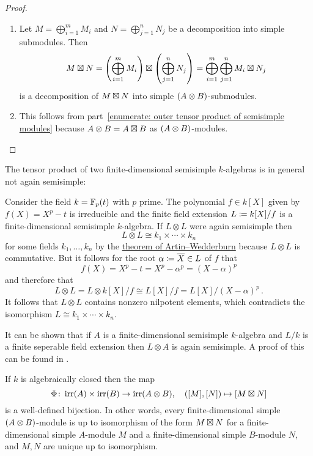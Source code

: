 \begin{proof}
  \leavevmode
  \begin{enumerate}
    \item
      Let $M = \bigoplus_{i=1}^m M_i$ and $N = \bigoplus_{j=1}^n N_j$ be a decomposition into simple submodules.
      Then
      \[
          M \mathbin{\boxtimes} N
        = \left( \bigoplus_{i=1}^m M_i \right) \mathbin{\boxtimes} \left( \bigoplus_{j=1}^n N_j \right)
        = \bigoplus_{i=1}^m \bigoplus_{j=1}^n M_i \mathbin{\boxtimes} N_j
      \]
      is a decomposition of $M \mathbin{\boxtimes} N$ into simple $(A \mathbin{\otimes} B)$-submodules.
    \item
      This follows from part~\ref*{enumerate: outer tensor product of semisimple modules} because $A \mathbin{\otimes} B = A \mathbin{\boxtimes} B$ as $(A \mathbin{\otimes} B)$-modules.
    \qedhere
  \end{enumerate}
\end{proof}


\begin{warning}
  The tensor product of two finite-dimensional semisimple $k$-algebras is in general not again semisimple:
  
  Consider the field $k = \mathbb{F}_p(t)$ with $p$ prime.
  The polynomial $f \in k[X]$ given by $f(X) = X^p - t$ is irreducible and the finite field extension $L \coloneqq k[X]/f$ is a finite-dimensional semisimple $k$-algebra.
  If $L \otimes L$ were again semisimple then
  \[
          L \otimes L
    \cong k_1 \times \dotsb \times k_n
  \]
  for some fields $k_1, \dotsc, k_n$ by the \hyperref[theorem: artin wedderburn theorem]{theorem of Artin--Wedderburn} because $L \otimes L$ is commutative.
  But it follows for the root $\alpha \coloneqq \overline{X} \in L$ of $f$ that
  \[
      f(X)
    = X^p - t
    = X^p - \alpha^p
    = (X - \alpha)^p
  \]
  and therefore that
  \[
          L \otimes L
    =     L \otimes k[X]/f
    \cong L[X]/f
    =     L[X]/(X-\alpha)^p \,.
  \]
  It follows that $L \otimes L$ contains nonzero nilpotent elements, which contradicts the isomorphism $L \cong k_1 \times \dotsb \times k_n$.
\end{warning}


\begin{remark}
  It can be shown that if $A$ is a finite-dimensional semisimple $k$-algebra and $L/k$ is a finite seperable field extension then $L \otimes A$ is again semisimple.
  A proof of this can be found in \cite[XVII, Theorem~6.2]{LangAlgebra2005}.
\end{remark}


\begin{theorem}
  \label{theorem: simple modules over tensor products}
  If $k$ is algebraically closed then the map
  \[
            \Phi
    \colon  \operatorname{irr}(A) \times \operatorname{irr}(B)
    \to     \operatorname{irr}(A \mathbin{\otimes} B),
    \quad   ([M],[N])
    \mapsto [M \mathbin{\boxtimes} N]
  \]
  is a well-defined bijection.
  In other words, every finite-dimensional simple $(A \mathbin{\otimes} B)$-module is up to isomorphism of the form $M \mathbin{\boxtimes} N$ for a finite-dimensional simple $A$-module $M$ and a finite-dimensional simple $B$-module $N$, and $M, N$ are unique up to isomorphism.
\end{theorem}


